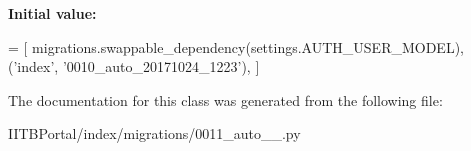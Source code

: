 {\bfseries Initial value\+:}
\begin{DoxyCode}
=  [
        migrations.swappable\_dependency(settings.AUTH\_USER\_MODEL),
        (\textcolor{stringliteral}{'index'}, \textcolor{stringliteral}{'0010\_auto\_20171024\_1223'}),
    ]
\end{DoxyCode}


The documentation for this class was generated from the following file\+:\begin{DoxyCompactItemize}
\item 
I\+I\+T\+B\+Portal/index/migrations/0011\+\_\+auto\+\_\+\_.\+py\end{DoxyCompactItemize}
